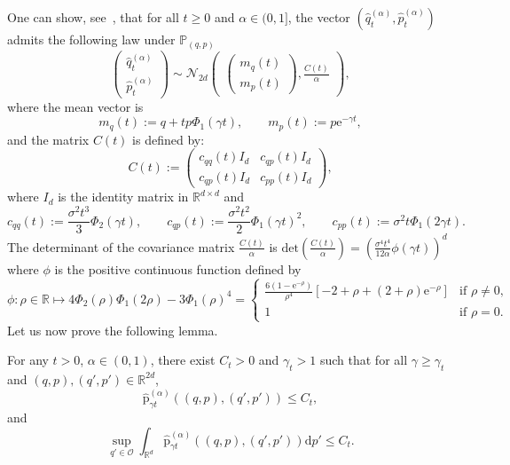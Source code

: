 \documentclass[preprint,EJP]{ejpecp}
\begin{document}
 \noindent One can show, see~\cite[Section 5.1]{LelRamRey}, that for all $t \geq 0$ and $\alpha\in(0,1]$, the vector $(\widehat{q}_t^{(\alpha)},\widehat{p}_t^{(\alpha)})$ admits the following law under $\mathbb{P}_{(q,p)}$
\begin{equation}\label{loi gaussienne}
\begin{pmatrix}
\widehat{q}^{(\alpha)}_t  \\
\widehat{p}^{(\alpha)}_t
\end{pmatrix}
  \sim  \mathcal{N}_{2d}\left(
\begin{matrix} 
\begin{pmatrix}
m_q(t)  \\
m_p(t) 
\end{pmatrix},
\frac{C(t)}{\alpha}
\end{matrix} 
\right)  , 
\end{equation}
where the mean vector is $$m_q(t):=q+t p \Phi_1(\gamma t),\qquad m_p(t):=p \mathrm{e}^{-\gamma  t},$$
and the matrix $C(t)$ is defined by:
$$C(t):= \begin{pmatrix}
c_{qq}(t)  I_d & c_{qp}(t)  I_d \\
c_{qp}(t)  I_d & c_{pp}(t)  I_d 
\end{pmatrix}, 
$$
where $I_d$ is the identity matrix in $\mathbb{R}^{d\times d}$ and
\begin{equation}\label{coeff cov}
    c_{qq}(t):=\frac{\sigma^2 t^3}{3} \Phi_2(\gamma t),\qquad c_{qp}(t):=\frac{\sigma^2 t^2}{2} \Phi_1(\gamma t)^2,\qquad c_{pp}(t):=\sigma^2t \Phi_1(2\gamma t)  . 
\end{equation} 
The determinant of the covariance matrix $\frac{C(t)}{\alpha}$ is $\mathrm{det}(\frac{C(t)}{\alpha})=(\frac{\sigma^4 t^4}{12\alpha} \phi(\gamma t))^d$ where $\phi$ is the positive continuous function defined by 
\begin{equation}\label{expr phi}
\phi:\rho\in\mathbb{R}\mapsto 4 \Phi_2(\rho) \Phi_1(2 \rho)-3 \Phi_1(\rho)^4=\begin{cases}
    \frac{6 (1-\mathrm{e}^{-\rho})}{\rho^4}\left[-2+\rho+(2+\rho)\mathrm{e}^{-\rho}\right]&\text{if $\rho\neq0$,}\\
   1 &\text{if $\rho=0$.}
\end{cases}
\end{equation}
Let us now prove the following lemma. 
 \begin{lemma}\label{densite prop} 
    For any $t>0$, $\alpha\in(0,1)$, there exist $C_t>0$ and $\gamma_t>1$ such that for all $\gamma\geq\gamma_t$ and $(q,p),(q',p')\in\mathbb{R}^{2d}$, 
    \begin{equation}\label{borne densite gamma1}
       \widehat{\mathrm{p}}^{(\alpha)}_{\gamma t}((q,p),(q',p'))\leq C_t,
    \end{equation}
    and
    \begin{equation}\label{borne densite gamma2}
        \sup_{q'\in\mathcal{O}}\int_{\mathbb{R}^d}\widehat{\mathrm{p}}^{(\alpha)}_{\gamma t}((q,p),(q',p')) \mathrm{d}p'\leq C_t. 
    \end{equation} 
\end{lemma}
\end{document}
